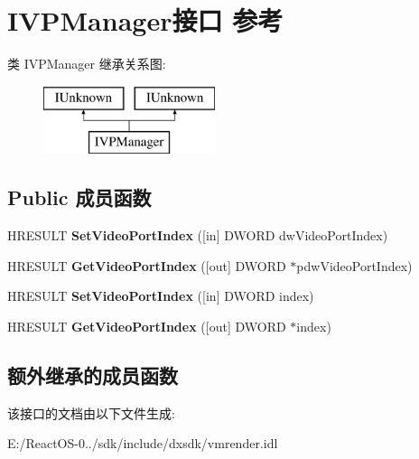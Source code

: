 \hypertarget{interface_i_v_p_manager}{}\section{I\+V\+P\+Manager接口 参考}
\label{interface_i_v_p_manager}
类 I\+V\+P\+Manager 继承关系图\+:\begin{figure}[H]
\begin{center}
\leavevmode
\includegraphics[height=2.000000cm]{interface_i_v_p_manager}
\end{center}
\end{figure}
\subsection*{Public 成员函数}
\begin{DoxyCompactItemize}
\item 
\mbox{\label{interface_i_v_p_manager_ac4e4667a556717ce5f6639edd8004ed2}} 
H\+R\+E\+S\+U\+LT {\bfseries Set\+Video\+Port\+Index} (\mbox{[}in\mbox{]} D\+W\+O\+RD dw\+Video\+Port\+Index)
\item 
\mbox{\label{interface_i_v_p_manager_a8c9e1dfd87354adb76ecf8ac64cd88c1}} 
H\+R\+E\+S\+U\+LT {\bfseries Get\+Video\+Port\+Index} (\mbox{[}out\mbox{]} D\+W\+O\+RD $\ast$pdw\+Video\+Port\+Index)
\item 
\mbox{\label{interface_i_v_p_manager_a365a3a6a6120f66393d99078b02e16af}} 
H\+R\+E\+S\+U\+LT {\bfseries Set\+Video\+Port\+Index} (\mbox{[}in\mbox{]} D\+W\+O\+RD index)
\item 
\mbox{\label{interface_i_v_p_manager_ae356ed1bdb9f640c5911356fa2618df7}} 
H\+R\+E\+S\+U\+LT {\bfseries Get\+Video\+Port\+Index} (\mbox{[}out\mbox{]} D\+W\+O\+RD $\ast$index)
\end{DoxyCompactItemize}
\subsection*{额外继承的成员函数}


该接口的文档由以下文件生成\+:\begin{DoxyCompactItemize}
\item 
E\+:/\+React\+O\+S-\/0../sdk/include/dxsdk/vmrender.\+idl\end{DoxyCompactItemize}
